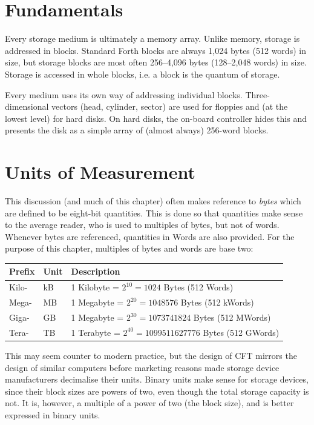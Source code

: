 \section{Fundamentals}

Every storage medium is ultimately a memory array. Unlike memory, storage is
addressed in blocks. Standard Forth blocks are always 1,024 bytes (512 words)
in size, but storage blocks are most often 256–4,096 bytes (128–2,048 words) in
size. Storage is accessed in whole blocks, i.e. a block is the quantum of
storage. 

Every medium uses its own way of addressing individual
blocks. Three-dimensional vectors (head, cylinder, sector) are used for
floppies and (at the lowest level) for hard disks. On hard disks, the on-board
controller hides this and presents the disk as a simple array of (almost
always) 256-word blocks.

\section{Units of Measurement}

This discussion (and much of this chapter) often makes reference to
{\em bytes\/} which are defined to be eight-bit quantities. This is
done so that quantities make sense to the average reader, who is used
to multiples of bytes, but not of words. Whenever bytes are
referenced, quantities in Words are also provided. For the purpose of
this chapter, multiples of bytes and words are base two:

\begin{center}
  \zebra
  \begin{tabular}{lll}
    Prefix & Unit    & Description\\\hline
    Kilo-  & kB      & 1 Kilobyte = $2^{10}=1024$ Bytes (512 Words) \\
    Mega-  & MB      & 1 Megabyte = $2^{20}=1048576$ Bytes (512 kWords) \\
    Giga-  & GB      & 1 Megabyte = $2^{30}=1073741824$ Bytes (512 MWords) \\
    Tera-  & TB      & 1 Terabyte = $2^{40}=1099511627776$ Bytes (512 GWords) \\
    \hline
  \end{tabular}
\end{center}%
%
\noindent This may seem counter to modern practice, but the design of
CFT mirrors the design of similar computers before marketing reasons
made storage device manufacturers decimalise their units. Binary units
make sense for storage devices, since their block sizes are powers of
two, even though the total storage capacity is not. It is, however, a
multiple of a power of two (the block size), and is better expressed
in binary units.

